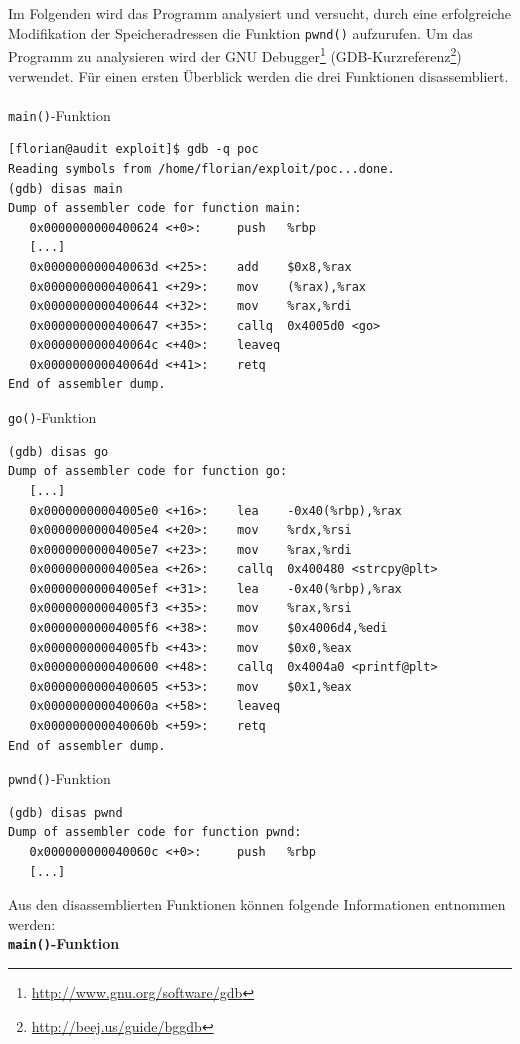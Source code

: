 \newpage
Im Folgenden wird das Programm analysiert und versucht, durch eine erfolgreiche Modifikation der Speicheradressen die Funktion \texttt{pwnd()} aufzurufen.
Um das Programm zu analysieren wird der GNU Debugger\footnote{\url{http://www.gnu.org/software/gdb}} 
(GDB-Kurzreferenz\footnote{\url{http://beej.us/guide/bggdb}}) verwendet. 
Für einen ersten Überblick werden die drei Funktionen disassembliert.
\\
\\
\texttt{main()}-Funktion
\begin{lstlisting}[basicstyle=\ttfamily\footnotesize]
[florian@audit exploit]$ gdb -q poc
Reading symbols from /home/florian/exploit/poc...done.
(gdb) disas main
Dump of assembler code for function main:
   0x0000000000400624 <+0>:     push   %rbp
   [...]
   0x000000000040063d <+25>:    add    $0x8,%rax
   0x0000000000400641 <+29>:    mov    (%rax),%rax
   0x0000000000400644 <+32>:    mov    %rax,%rdi
   0x0000000000400647 <+35>:    callq  0x4005d0 <go>
   0x000000000040064c <+40>:    leaveq
   0x000000000040064d <+41>:    retq
End of assembler dump.
\end{lstlisting}


\texttt{go()}-Funktion
\begin{lstlisting}[basicstyle=\ttfamily\footnotesize]
(gdb) disas go
Dump of assembler code for function go:
   [...]
   0x00000000004005e0 <+16>:    lea    -0x40(%rbp),%rax
   0x00000000004005e4 <+20>:    mov    %rdx,%rsi
   0x00000000004005e7 <+23>:    mov    %rax,%rdi
   0x00000000004005ea <+26>:    callq  0x400480 <strcpy@plt>
   0x00000000004005ef <+31>:    lea    -0x40(%rbp),%rax
   0x00000000004005f3 <+35>:    mov    %rax,%rsi
   0x00000000004005f6 <+38>:    mov    $0x4006d4,%edi
   0x00000000004005fb <+43>:    mov    $0x0,%eax
   0x0000000000400600 <+48>:    callq  0x4004a0 <printf@plt>
   0x0000000000400605 <+53>:    mov    $0x1,%eax
   0x000000000040060a <+58>:    leaveq
   0x000000000040060b <+59>:    retq
End of assembler dump.
\end{lstlisting}

\newpage
\texttt{pwnd()}-Funktion
\begin{lstlisting}[basicstyle=\ttfamily\footnotesize]
(gdb) disas pwnd
Dump of assembler code for function pwnd:
   0x000000000040060c <+0>:     push   %rbp
   [...]
\end{lstlisting}
\par\medskip 
Aus den disassemblierten Funktionen können folgende Informationen entnommen werden:
\\
\textbf{\texttt{main()}-Funktion}

